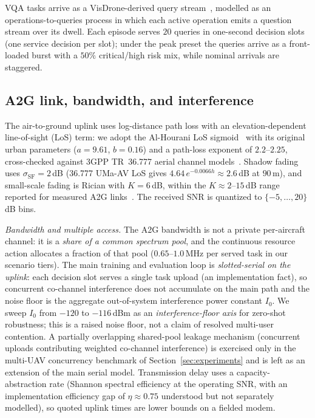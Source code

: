 VQA tasks arrive as a VisDrone-derived query stream~\cite{zhu2021visdrone},
modelled as an operations-to-queries process in which each active operation
emits a question stream over its dwell. Each episode serves $20$ queries in
one-second decision slots (one service decision per slot); under the peak
preset the queries arrive as a front-loaded burst with a $50\%$
critical/high risk mix, while nominal arrivals are staggered.

\subsection{A2G link, bandwidth, and interference}\label{subsec:a2g}
The air-to-ground uplink uses log-distance path loss with an
elevation-dependent line-of-sight (LoS) term: we adopt the Al-Hourani LoS
sigmoid~\cite{alhourani2014optimal} with its original urban parameters
($a{=}9.61$, $b{=}0.16$) and a path-loss exponent of $2.2$--$2.25$,
cross-checked against 3GPP TR~36.777 aerial
channel models~\cite{3gpp2020tr36777}. Shadow fading uses
$\sigma_{\mathrm{SF}}=2$\,dB (36.777 UMa-AV LoS gives
$4.64\,e^{-0.0066h}\!\approx\!2.6$\,dB at $90$\,m), and small-scale fading is
Rician with $K{=}6$\,dB, within the $K\!\approx\!2$--$15$\,dB range reported
for measured A2G links~\cite{khawaja2019survey}. The received SNR is
quantized to $\{-5,\dots,20\}$\,dB bins.

\emph{Bandwidth and multiple access.} The A2G bandwidth is not a private
per-aircraft channel: it is a \emph{share of a common spectrum pool}, and
the continuous resource action allocates a fraction of that pool
($0.65$--$1.0$\,MHz per served task in our scenario tiers). The main
training and evaluation loop is \emph{slotted-serial on the uplink}: each
decision slot serves a single task upload (an implementation fact), so
concurrent co-channel interference does not accumulate on the main path and
the noise floor is the aggregate out-of-system interference power constant
$I_0$. We sweep $I_0$ from $-120$ to $-116$\,dBm as an
\emph{interference-floor axis} for zero-shot robustness; this is a raised
noise floor, not a claim of resolved multi-user contention. A partially
overlapping shared-pool leakage mechanism (concurrent uploads contributing
weighted co-channel interference) is exercised only in the multi-UAV
concurrency benchmark of Section~\ref{sec:experiments} and is left as an
extension of the main serial model. Transmission delay uses a
capacity-abstraction rate (Shannon spectral efficiency at the operating
SNR, with an implementation efficiency gap of $\eta\!\approx\!0.75$
understood but not separately modelled), so quoted uplink times are
lower bounds on a fielded modem.

